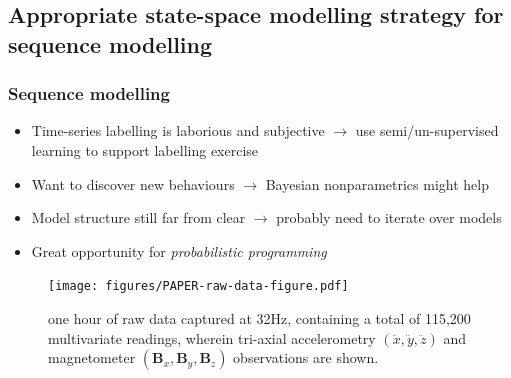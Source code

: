 \documentclass[aspectratio=169]{beamer}
\begin{document}

\begin{frame}
    \subsection{Appropriate state-space modelling strategy for sequence modelling}

    \frametitle{Sequence modelling}
    \begin{itemize}
        \item Time-series labelling is laborious and subjective $\rightarrow$ use semi/un-supervised learning to support labelling exercise
        \item Want to discover new behaviours $\rightarrow$ Bayesian nonparametrics might help 
        \item Model structure still far from clear $\rightarrow$ probably need to iterate over models 
        \item Great opportunity for \emph{probabilistic programming}
    \end{itemize}
    \vspace{-1em}
    \begin{figure}
        \centering
        \texttt{[image: figures/PAPER-raw-data-figure.pdf]}
        \vspace{-0.5em}
    \caption{one hour of raw data captured at 32Hz, containing a total of 115,200 multivariate readings, wherein tri-axial accelerometry $(\ddot{x},\ddot{y},\ddot{z})$ and magnetometer $(\mathbf{B}_x,\mathbf{B}_y,\mathbf{B}_z)$ observations are shown.}
    \end{figure}
    

\end{frame}


\end{document}

